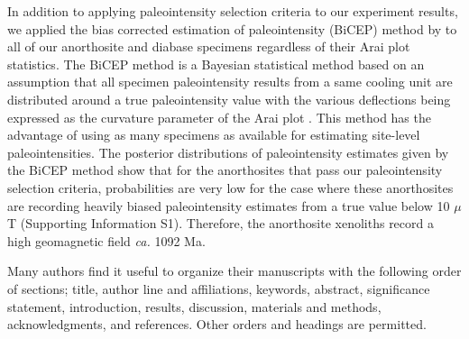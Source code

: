 \documentclass[9pt,twocolumn,twoside,lineno]{pnas-new}
\begin{document}
In addition to applying paleointensity selection criteria to our experiment results, we applied the bias corrected estimation of paleointensity (BiCEP) method by \cite{Cych2021a} to all of our anorthosite and diabase specimens regardless of their Arai plot statistics. The BiCEP method is a Bayesian statistical method based on an assumption that all specimen paleointensity results from a same cooling unit are distributed around a true paleointensity value with the various deflections being expressed as the curvature parameter of the Arai plot \cite{Paterson2011a}. This method has the advantage of using as many specimens as available for estimating site-level paleointensities. The posterior distributions of paleointensity estimates given by the BiCEP method show that for the anorthosites that pass our paleointensity selection criteria, probabilities are very low for the case where these anorthosites are recording heavily biased paleointensity estimates from a true value below 10 $\mu$T (Supporting Information S1). Therefore, the anorthosite xenoliths record a high geomagnetic field \textit{ca.} 1092 Ma. 

Many authors find it useful to organize their manuscripts with the following order of sections;  title, author line and affiliations, keywords, abstract, significance statement, introduction, results, discussion, materials and methods, acknowledgments, and references. Other orders and headings are permitted.
\end{document}
